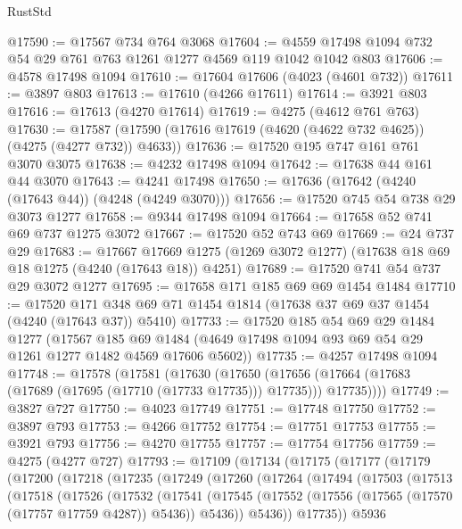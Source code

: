 \begin{lexlean}{RustStd}
\begin{coremodule}
{\begin{coremodule}
{{{{{{{{{{{{{{{{{{{{{{{{{{{{{{{{{{{@17590 := @17567 @734 @764 @3068
@17604 := @4559 @17498 @1094 @732 @54 @29 @761 @763 @1261 @1277 @4569 @119 @1042 @1042 @803
@17606 := @4578 @17498 @1094
@17610 := @17604 @17606 (@4023 (@4601 @732))
@17611 := @3897 @803
@17613 := @17610 (@4266 @17611)
@17614 := @3921 @803
@17616 := @17613 (@4270 @17614)
@17619 := @4275 (@4612 @761 @763)
@17630 := @17587 (@17590 (@17616 @17619 (@4620 (@4622 @732 @4625)) (@4275 (@4277 @732)) @4633))
@17636 := @17520 @195 @747 @161 @761 @3070 @3075
@17638 := @4232 @17498 @1094
@17642 := @17638 @44 @161 @44 @3070
@17643 := @4241 @17498
@17650 := @17636 (@17642 (@4240 (@17643 @44)) (@4248 (@4249 @3070)))
@17656 := @17520 @745 @54 @738 @29 @3073 @1277
@17658 := @9344 @17498 @1094
@17664 := @17658 @52 @741 @69 @737 @1275 @3072
@17667 := @17520 @52 @743 @69
@17669 := @24 @737 @29
@17683 := @17667
    @17669
    @1275
    (@1269 @3072 @1277)
    (@17638 @18 @69 @18 @1275 (@4240 (@17643 @18)) @4251)
@17689 := @17520 @741 @54 @737 @29 @3072 @1277
@17695 := @17658 @171 @185 @69 @69 @1454 @1484
@17710 := @17520 @171 @348 @69 @71 @1454 @1814 (@17638 @37 @69 @37 @1454 (@4240 (@17643 @37)) @5410)
@17733 := @17520
    @185
    @54
    @69
    @29
    @1484
    @1277
    (@17567
      @185
      @69
      @1484
      (@4649 @17498 @1094 @93 @69 @54 @29 @1261 @1277 @1482 @4569 @17606 @5602))
@17735 := @4257 @17498 @1094
@17748 := @17578
    (@17581
      (@17630
        (@17650
          (@17656 (@17664 (@17683 (@17689 (@17695 (@17710 (@17733 @17735))) @17735))) @17735))))
@17749 := @3827 @727
@17750 := @4023 @17749
@17751 := @17748 @17750
@17752 := @3897 @793
@17753 := @4266 @17752
@17754 := @17751 @17753
@17755 := @3921 @793
@17756 := @4270 @17755
@17757 := @17754 @17756
@17759 := @4275 (@4277 @727)
@17793 := @17109
    (@17134
      (@17175
        (@17177
          (@17179
            (@17200
              (@17218
                (@17235
                  (@17249
                    (@17260
                      (@17264
                        (@17494
                          (@17503
                            (@17513
                              (@17518
                                (@17526
                                  (@17532
                                    (@17541
                                      (@17545
                                        (@17552
                                          (@17556 (@17565 (@17570 (@17757 @17759 @4287)) @5436))
                                          @5436))
                                      @5436))
                                  @17735))
                              @5936
}}}}}}}}}}}}}}}}}}}}}}}}}}}}}}}}}}}
\end{coremodule}}
\end{coremodule}
\end{lexlean}
